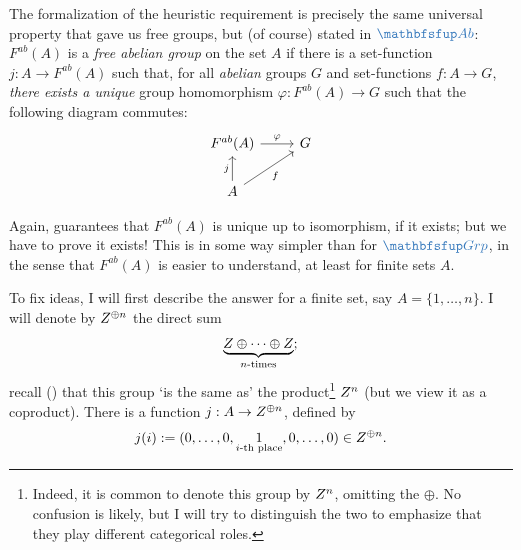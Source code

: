 The formalization of the heuristic requirement is precisely the same
universal property that gave us free groups, but (of course) stated in
$\categ{Ab}$: $F^{ab}(A)$ is a \emph{free abelian group} on the set
$A$ if there is a set-function $j : A \to F^{ab}(A)$ such that, for
all \emph{abelian} groups $G$ and set-functions $f : A \to G$,
\emph{there exists a unique} group homomorphism
$\varphi : F^{ab}(A) \to G$ such that the following diagram commutes:
\[
  \begin{tikzcd}
    F^{ab}(A) \arrow[r, "\varphi"] & G \\
    A \arrow[u, "j"] \arrow[ur, "f"'] &
  \end{tikzcd}
\]

Again,  guarantees that
$F^{ab}(A)$ is unique up to isomorphism, if it exists; but we have to
prove it exists! This is in some way simpler than for $\categ{Grp}$,
in the sense that $F^{ab}(A)$ is easier to understand, at least for
finite sets $A$.

To fix ideas, I will first describe the answer for a finite set, say
$A = \{1, \dots, n\}$. I will denote by $Z^{\oplus n}$ the direct sum
\[
  \underbrace{Z \oplus \cdots \oplus Z}_{n\text{-times}};
\]
recall () that this group `is
the same as' the product\footnote{Indeed, it is common to denote this
  group by $Z^n$, omitting the $\oplus$. No confusion is likely, but
  I will try to distinguish the two to emphasize that they play
  different categorical roles.} $Z^n$ (but we view it as a
coproduct). There is a function $j : A \to Z^{\oplus n}$, defined by
\[
  j(i) := (0, \dots, 0, \underset{i\text{-th place}}{1}, 0, \dots, 0)
  \in Z^{\oplus n}.
\]

